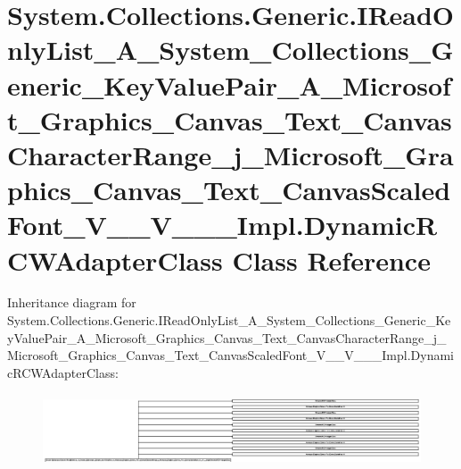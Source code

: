 \hypertarget{class_system_1_1_collections_1_1_generic_1_1_i_read_only_list___a___system___collections___gener59f03383ddf862c5034ae163cf6d9cbb}{}\section{System.\+Collections.\+Generic.\+I\+Read\+Only\+List\+\_\+\+A\+\_\+\+System\+\_\+\+Collections\+\_\+\+Generic\+\_\+\+Key\+Value\+Pair\+\_\+\+A\+\_\+\+Microsoft\+\_\+\+Graphics\+\_\+\+Canvas\+\_\+\+Text\+\_\+\+Canvas\+Character\+Range\+\_\+j\+\_\+\+Microsoft\+\_\+\+Graphics\+\_\+\+Canvas\+\_\+\+Text\+\_\+\+Canvas\+Scaled\+Font\+\_\+\+V\+\_\+\+\_\+\+V\+\_\+\+\_\+\+\_\+\+Impl.\+Dynamic\+R\+C\+W\+Adapter\+Class Class Reference}
\label{class_system_1_1_collections_1_1_generic_1_1_i_read_only_list___a___system___collections___gener59f03383ddf862c5034ae163cf6d9cbb}
Inheritance diagram for System.\+Collections.\+Generic.\+I\+Read\+Only\+List\+\_\+\+A\+\_\+\+System\+\_\+\+Collections\+\_\+\+Generic\+\_\+\+Key\+Value\+Pair\+\_\+\+A\+\_\+\+Microsoft\+\_\+\+Graphics\+\_\+\+Canvas\+\_\+\+Text\+\_\+\+Canvas\+Character\+Range\+\_\+j\+\_\+\+Microsoft\+\_\+\+Graphics\+\_\+\+Canvas\+\_\+\+Text\+\_\+\+Canvas\+Scaled\+Font\+\_\+\+V\+\_\+\+\_\+\+V\+\_\+\+\_\+\+\_\+\+Impl.\+Dynamic\+R\+C\+W\+Adapter\+Class\+:\begin{figure}[H]
\begin{center}
\leavevmode
\includegraphics[height=2.132964cm]{class_system_1_1_collections_1_1_generic_1_1_i_read_only_list___a___system___collections___gener59f03383ddf862c5034ae163cf6d9cbb}
\end{center}
\end{figure}
